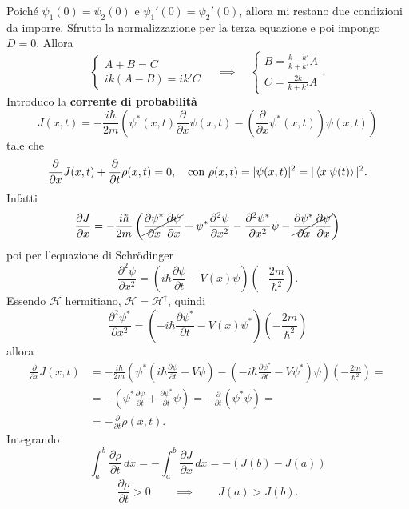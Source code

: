 \bigskip
\noindent
Poiché \( \psi_1(0) = \psi_2(0) \) e \( \psi_1'(0) = \psi_2'(0) \), allora mi restano due condizioni da imporre. Sfrutto la normalizzazione per la terza equazione e poi impongo \( D = 0 \). Allora 
\[
\begin{cases}
A + B = C \\
ik(A - B) = ik'C 
\end{cases} \quad \implies \quad \begin{cases}
B = \frac{k - k'}{k + k'} A \\
C = \frac{2k}{k + k'} A
\end{cases}.
\]
Introduco la \textbf{corrente di probabilità}
\[
J(x, t) = -\frac{i\hbar}{2m} \left( \psi^*(x, t) \frac{\partial}{\partial x} \psi(x, t) - \left( \frac{\partial}{\partial x} \psi^*(x, t) \right) \psi(x, t) \right)
\]
tale che
\[
\frac{\partial}{\partial x} J(x, t) + \frac{\partial}{\partial t} \rho(x, t) = 0, \quad \text{con } \rho(x, t) = |\psi(x, t)|^2 = |\braket{x|\psi(t)}|^2.
\]
Infatti
\[
\frac{\partial J}{\partial x} = -\frac{i\hbar}{2m} \left( \cancel{\frac{\partial \psi^*}{\partial x} \frac{\partial \psi}{\partial x}} + \psi^* \frac{\partial^2 \psi}{\partial x^2} - \frac{\partial^2 \psi^*}{\partial x^2} \psi - \cancel{\frac{\partial \psi^*}{\partial x} \frac{\partial \psi}{\partial x}} \right)
\]
poi per l'equazione di Schr\"odinger
\[
\frac{\partial^2 \psi}{\partial x^2} = \left( i\hbar\frac{\partial \psi}{\partial t} -V(x)\psi \right) \left( -\frac{2m}{\hbar^2} \right).
\]
Essendo \( \mathcal{H} \) hermitiano, \( \mathcal{H} = \mathcal{H}^\dag \), quindi 
\[
\frac{\partial^2 \psi^*}{\partial x^2} = \left( -i\hbar\frac{\partial \psi^*}{\partial t} - V(x) \psi^* \right) \left( -\frac{2m}{\hbar^2} \right)
\]
allora 
\begin{align*}
\frac{\partial}{\partial x} J(x, t) &= -\frac{i\hbar}{2m} \left( \psi^* \left( i\hbar\frac{\partial \psi}{\partial t} - V \psi \right) - \left( -i\hbar\frac{\partial \psi^*}{\partial t} - V \psi^* \right) \psi \right) \left( -\frac{2m}{\hbar^2} \right) = \\
&= - \left( \psi^* \frac{\partial \psi}{\partial t} + \frac{\partial \psi^*}{\partial t} \psi \right) = - \frac{\partial}{\partial t} \left( \psi^* \psi \right) = \\
&= -\frac{\partial}{\partial t} \rho(x, t).
\end{align*}
Integrando
\[
\int_a^b \frac{\partial \rho}{\partial t} \, dx = -\int_a^b \frac{\partial J}{ \partial x} \, dx = - \left( J(b) - J(a) \right)
\]
\[
\frac{\partial \rho}{\partial t} > 0 \qquad \implies \qquad J(a) > J(b).
\]
